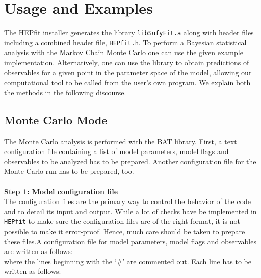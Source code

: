 \documentclass[preprint,3p,12pt]{elsarticle}
\newcommand{\HEPfit}{\texttt{HEPfit}\xspace}
\begin{document}
\section{Usage and Examples}
\label{sec:Usage}
The HEPfit installer generates the 
library \texttt{libSufyFit.a} along with header files including a combined
header file, \texttt{HEPfit.h}. To perform a Bayesian statistical analysis with the
Markov Chain Monte Carlo one can use the given example implementation.
Alternatively, one can use the library to obtain predictions
of observables for a given point in the parameter space of the model, 
allowing our computational tool to be called from the user's own program. We explain both the methods in the following discourse. 

\subsection{Monte Carlo Mode}
\label{sec:MC}

The Monte Carlo analysis is performed with the BAT library. First,
a text configuration file containing a list of model parameters,
model flags and observables to be analyzed has to be prepared. Another configuration
file for the Monte Carlo run has to be prepared, too.\\\\
%
{\bf \large Step 1: Model configuration file}\\


The configuration files are the primary way to control the behavior of the code and to detail its input and output. While a lot of checks have be implemented in \HEPfit to make sure the configuration files are of the right format, it is not possible to make it error-proof. Hence, much care should be taken to prepare these files.A configuration file for model parameters, model flags and
observables are written as follows:\\


where the lines beginning with the `\#' are commented out. Each line has to be written as follows: 
\end{document}
